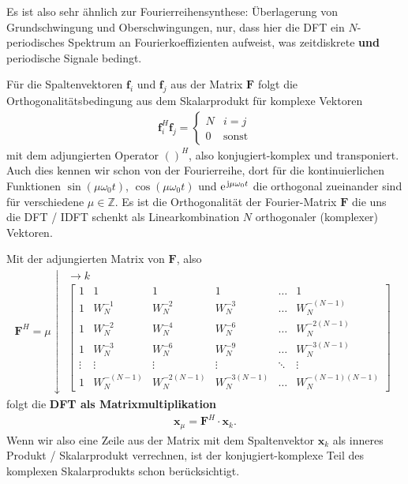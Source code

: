 Es ist also sehr ähnlich zur Fourierreihensynthese: Überlagerung von
Grundschwingung und Oberschwingungen, nur, dass hier die DFT ein $N$-periodisches
Spektrum an Fourierkoeffizienten aufweist, was zeitdiskrete \textbf{und}
periodische Signale bedingt.
%

Für die Spaltenvektoren $\bm{f}_i$ und $\bm{f}_j$ aus der Matrix $\bm{F}$
folgt die Orthogonalitätsbedingung aus dem Skalarprodukt für komplexe Vektoren
\begin{align}
\bm{f}_i^H \bm{f}_j =
\begin{cases}
N & i=j\\
0 & \text{sonst}
\end{cases}
\end{align}
mit dem adjungierten Operator $()^H$, also konjugiert-komplex und transponiert.
Auch dies kennen wir schon von der Fourierreihe, dort für die kontinuierlichen
Funktionen
$\sin(\mu \omega_0 t)$, $\cos(\mu \omega_0 t)$ und $\e^{\im \mu \omega_0 t}$ die
orthogonal zueinander sind für verschiedene $\mu\in\mathbb{Z}$.
%
Es ist die Orthogonalität der Fourier-Matrix $\bm{F}$ die uns die DFT / IDFT
schenkt als Linearkombination $N$ orthogonaler (komplexer) Vektoren.
%

Mit der adjungierten Matrix von $\bm{F}$, also
\begin{align}
\bm{F}^H =
\mu \downarrow
\substack{\rightarrow k\\
\begin{bmatrix}
1 & 1 & 1 & 1 & \dots & 1\\[1em]
1 & W_N^{-1} & W_N^{-2} & W_N^{-3} & \dots & W_N^{-(N-1)}\\[1em]
1 & W_N^{-2} & W_N^{-4} & W_N^{-6} & \dots & W_N^{-2(N-1)}\\[1em]
1 & W_N^{-3} & W_N^{-6} & W_N^{-9} & \dots & W_N^{-3(N-1)}\\[1em]
\vdots & \vdots & \vdots &\vdots &\ddots & \vdots\\[1em]
1 & W_N^{-(N-1)} & W_N^{-2(N-1)} & W_N^{-3(N-1)} & \dots & W_N^{-(N-1)(N-1)}
\end{bmatrix}
}
\end{align}
folgt die \textbf{DFT als Matrixmultiplikation}
\begin{align}
\bm{x}_\mu = \bm{F}^H \cdot \bm{x}_k.
\end{align}
Wenn wir also eine Zeile aus der Matrix mit dem Spaltenvektor $\bm{x}_k$
als inneres Produkt / Skalarprodukt
verrechnen, ist der konjugiert-komplexe Teil des komplexen Skalarprodukts schon
berücksichtigt.




